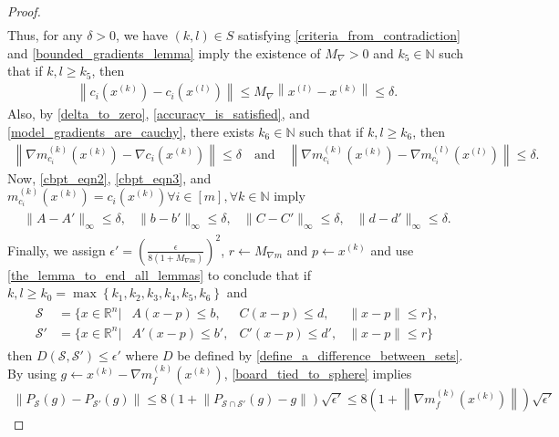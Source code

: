 \documentclass{article}
\theoremstyle{case}
\numberwithin{theorem}{subsection}
\newcommand{\gk}{{\nabla m_f^{(k)}\left(\xk\right)}}
\newcommand{\gmcik}{{\nabla m_{c_i}^{(k)}\left(\xk\right)}}
\newcommand{\gmcil}{{\nabla m_{c_i}^{(l)}\left(\xl\right)}}
\newcommand{\maxgrad}{{M_{\nabla}}}
\newcommand{\naturals}{\mathbb N}
\newcommand{\Rn}{\mathbb R^n}
\newcommand{\xk}{x^{(k)}}
\newcommand{\xl}{{x^{(l)}}}
\newcommand{\maxmodelgrad}{{M_{\nabla m}}}
\newcommand{\convexdistance}{{D}}
\begin{document}
\begin{proof}
\begin{align*}
\end{align*}
Thus, for any $\delta > 0$, we have
$(k, l) \in S$ satisfying \cref{criteria_from_contradiction} and
\cref{bounded_gradients_lemma} imply the existence of $\maxgrad > 0$ and $k_5 \in \naturals$ such that if $k, l \ge k_5$, 
then
\begin{align}
\left\|c_i\left(\xk\right) - c_i\left(\xl\right) \right\| \le \maxgrad \left\|\xl - \xk\right\| \le \delta. \label{cbpt_eqn2}
\end{align}
Also, by \cref{delta_to_zero}, \cref{accuracy_is_satisfied}, and \cref{model_gradients_are_cauchy}, 
there exists $k_6 \in \naturals$ such that if $k, l \ge k_6$, then
\begin{align}
\left\|\gmcik - \nabla c_i\left(\xk\right)\right\| \le \delta \quad \textrm{and} \quad
\left\|\gmcik - \gmcil\right\| \le \delta. \label{cbpt_eqn3}
\end{align}
Now, \cref{cbpt_eqn2}, \cref{cbpt_eqn3}, and $m_{c_i}^{(k)}\left(\xk\right) = c_i\left(\xk\right) \forall i \in[m], \forall k \in \naturals$ imply
\begin{align*}
\begin{array}{cccc}
\|A - A'\|_{\infty} \le \delta,	& \|b - b'\|_{\infty} \le \delta,		& \|C - C'\|_{\infty} \le \delta,	& \|d - d'\|_{\infty} \le \delta.
\end{array}
\end{align*}
Finally, we assign $\epsilon' = \left(\frac {\epsilon}{8\left(1 + \maxmodelgrad\right)}\right)^2$,
$r \gets \maxmodelgrad$ and $p \gets \xk$ and use \cref{the_lemma_to_end_all_lemmas}
to conclude that if $k, l \ge k_0 = \max\left\{k_1, k_2, k_3, k_4, k_5, k_6\right\}$ and
\begin{align*}
\begin{array}{ccccc}
\mathcal S  &= \bigg\{x \in \Rn \bigg|& A (x - p) \le b ,& C (x - p) \le d ,& \|x - p\| \le r \bigg\}, \\
\mathcal S' &= \bigg\{x \in \Rn \bigg|& A'(x - p) \le b',& C'(x - p) \le d',& \|x - p\| \le r \bigg\}
\end{array}
\end{align*}
then $\convexdistance(\mathcal S, \mathcal S') \le \epsilon'$ where $\convexdistance$ be defined by \cref{define_a_difference_between_sets}.
By using $g \gets \xk - \gk$, \cref{board_tied_to_sphere} implies
\begin{align*}
\left\|P_{\mathcal S}(g) - P_{\mathcal S'}(g)\right\| 
\le 8\left(1 + \left\|P_{\mathcal S \cap \mathcal S'}(g) - g\right\|\right) \sqrt{\epsilon'} 
\le 8\left(1 + \left\|\gk\right\|\right) \sqrt{\epsilon'} 

\end{align*}
\end{proof}
\end{document}
